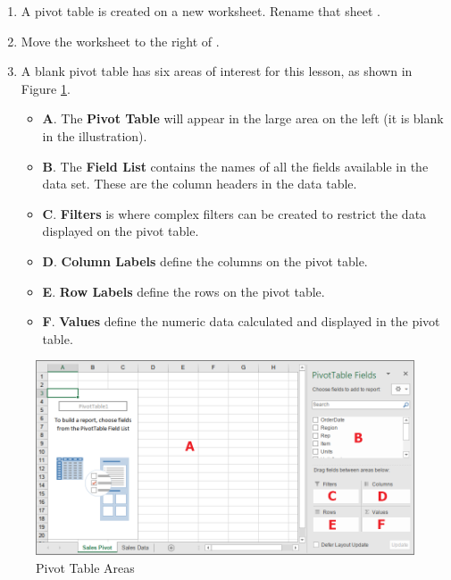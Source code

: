 \begin{enumerate}[resume]
	\item A pivot table is created on a new worksheet. Rename that sheet .
	\item Move the  worksheet to the right of .
	\item A blank pivot table has six areas of interest for this lesson, as shown in Figure \ref{07:fig13}.

	\begin{itemize}
		\item \textbf{A}. The \textbf{Pivot Table} will appear in the large area on the left (it is blank in the illustration).
		\item \textbf{B}. The \textbf{Field List} contains the names of all the fields available in the data set. These are the column headers in the data table.
		\item \textbf{C}. \textbf{Filters} is where complex filters can be created to restrict the data displayed on the pivot table.
		\item \textbf{D}. \textbf{Column Labels} define the columns on the pivot table.
		\item \textbf{E}. \textbf{Row Labels} define the rows on the pivot table.
		\item \textbf{F}. \textbf{Values} define the numeric data calculated and displayed in the pivot table.
	\end{itemize}
\end{enumerate}

\begin{figure}[H]
	\centering
	\includegraphics[width=\maxwidth{.95\linewidth}]{gfx/ch07_fig13}
	\caption{Pivot Table Areas}
	\label{07:fig13}
\end{figure}

